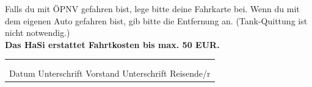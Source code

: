 \documentclass[a4paper]{article}
\begin{document}
Falls du mit ÖPNV gefahren bist, lege bitte deine Fahrkarte bei. Wenn du mit dem
eigenen Auto gefahren bist, gib bitte die Entfernung an. (Tank-Quittung ist
nicht notwendig.) \\\bf{Das HaSi erstattet Fahrtkosten bis max. 50 EUR.}
\\
\begin{Form}[]
\begin{tabular}{@{}p{11.5cm}@{}}
\\
\\

\\\midrule[0.5pt]
Datum \hspace{1.5cm} Unterschrift Vorstand \hspace{1.5cm} Unterschrift Reisende/r

\end{tabular}
\end{Form}
\end{document}
